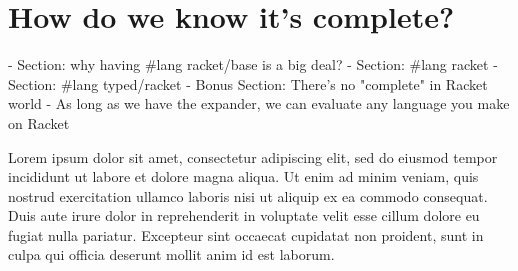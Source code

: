 \chapter{How do we know it's complete?}

- Section: why having \#lang racket/base is a big deal?
	- Section: \#lang racket
	- Section: \#lang typed/racket
	- Bonus Section: There's no "complete" in Racket world
		- As long as we have the expander, we can evaluate any language you make on Racket

Lorem ipsum dolor sit amet, consectetur adipiscing elit, sed do eiusmod tempor incididunt ut labore et dolore magna aliqua. Ut enim ad minim veniam, quis nostrud exercitation ullamco laboris nisi ut aliquip ex ea commodo consequat. Duis aute irure dolor in reprehenderit in voluptate velit esse cillum dolore eu fugiat nulla pariatur. Excepteur sint occaecat cupidatat non proident, sunt in culpa qui officia deserunt mollit anim id est laborum.
